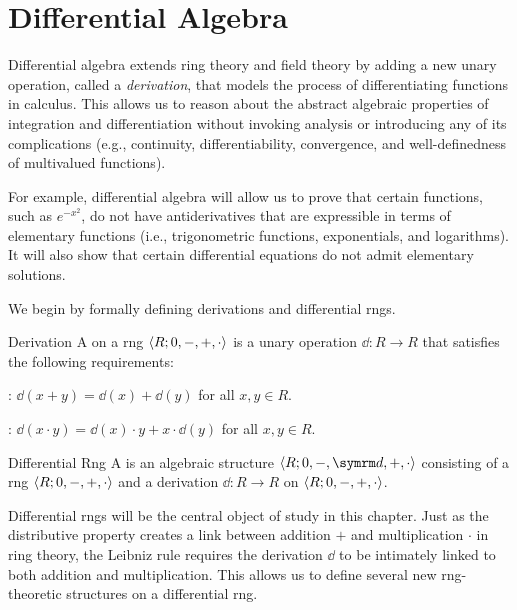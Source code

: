 
\chapter{Differential Algebra}

Differential algebra extends ring theory and field theory by adding a new unary operation, called a \textit{derivation}, that models the process of differentiating functions in calculus. This allows us to reason about the abstract algebraic properties of integration and differentiation without invoking analysis or introducing any of its complications (e.g., continuity, differentiability, convergence, and well-definedness of multivalued functions).

For example, differential algebra will allow us to prove that certain functions, such as $e^{-x^2}$, do not have antiderivatives that are expressible in terms of elementary functions (i.e., trigonometric functions, exponentials, and logarithms). It will also show that certain differential equations do not admit elementary solutions.

We begin by formally defining derivations and differential rngs.

\begin{dfnbox}{Derivation}
	A  on a rng ${\langle {R; 0, -, +, \cdot} \rangle}$ is a unary operation $\dd: R \to R$ that satisfies the following requirements:
	\begin{dfnitems}
		\item {}: $\dd(x + y) = \dd(x) + \dd(y)$ for all $x, y \in R$.
		\item {}: $\dd(x \cdot y) = \dd(x) \cdot y + x \cdot \dd(y)$ for all $x, y \in R$.
	\end{dfnitems}
\end{dfnbox}

\begin{dfnbox}{Differential Rng}
	A  is an algebraic structure $\alg{R; 0, -, \dd, +, \cdot}$ consisting of a rng ${\langle {R; 0, -, +, \cdot} \rangle}$ and a derivation $\dd: R \to R$ on ${\langle {R; 0, -, +, \cdot} \rangle}$.
\end{dfnbox}

Differential rngs will be the central object of study in this chapter. Just as the distributive property creates a link between addition $+$ and multiplication $\cdot$ in ring theory, the Leibniz rule requires the derivation $\dd$ to be intimately linked to both addition and multiplication. This allows us to define several new rng-theoretic structures on a differential rng.

